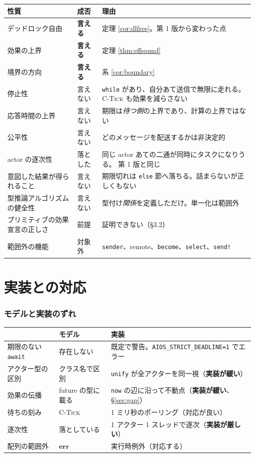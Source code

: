 \documentclass[11pt,a4paper]{ltjsarticle}
\theoremstyle{definition}
\theoremstyle{remark}
\begin{document}
\begin{center}
\small
\begin{tabular}{@{}llp{6.4cm}@{}}
\toprule
性質 & 成否 & 理由 \\
\midrule
デッドロック自由 & \textbf{言える} & 定理 \ref{cor:dlfree}。第 1 版から変わった点 \\
効果の上界 & \textbf{言える} & 定理 \ref{thm:effsound} \\
境界の方向 & \textbf{言える} & 系 \ref{cor:boundary} \\
\midrule
停止性 & 言えない &
  \texttt{while} があり、自分あて送信で無限に走れる。
  \textsc{C-Tick} も効果を減らさない \\
応答時間の上界 & 言えない &
  期限は\emph{待つ側}の上界であり、計算の上界ではない \\
公平性 & 言えない & どのメッセージを配送するかは非決定的 \\
actor の逐次性 & 落とした & 同じ actor あての二通が同時にタスクになりうる。
  第 1 版と同じ \\
意図した結果が得られること & 言えない &
  期限切れは \texttt{else} 節へ落ちる。詰まらないが正しくもない \\
型推論アルゴリズムの健全性 & 言えない &
  型付け\emph{関係}を定義しただけ。単一化は範囲外 \\
プリミティブの効果宣言の正しさ & 前提 & 証明できない（\S 3.2）\\
範囲外の機能 & 対象外 &
  \texttt{sender}、remote、\texttt{become}、\texttt{select}、\texttt{send!} \\
\bottomrule
\end{tabular}
\end{center}

\part{実装との対応}
\label{part:impl}

\section{モデルと実装のずれ}
\label{sec:impl}

\begin{center}
\small
\begin{tabular}{@{}lll@{}}
\toprule
 & モデル & 実装 \\
\midrule
期限のない \texttt{await} & 存在しない &
  既定で警告。\texttt{AIOS\_STRICT\_DEADLINE=1} でエラー \\
アクター型の区別 & クラス名で区別 &
  \texttt{unify} が全アクターを同一視（\textbf{実装が緩い}）\\
効果の伝播 & future の型に載る &
  \texttt{now} の辺に沿って不動点（\textbf{実装が緩い}、\S\ref{sec:gap}）\\
待ちの刻み & \textsc{C-Tick} &
  1 ミリ秒のポーリング（対応が良い）\\
逐次性 & 落としている &
  1 アクター 1 スレッドで逐次（\textbf{実装が厳しい}）\\
配列の範囲外 & $\mathbf{err}$ & 実行時例外（対応する）\\
\bottomrule
\end{tabular}
\end{center}
\end{document}
